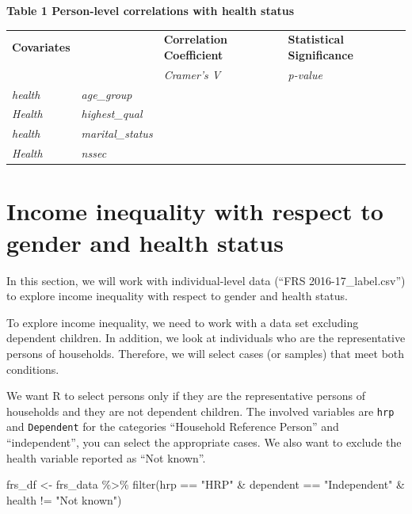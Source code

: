 \documentclass[
  letterpaper,
  DIV=11,
  numbers=noendperiod]{scrreprt}
\newenvironment{Shaded}{\begin{snugshade}}{\end{snugshade}}
\newcommand{\FunctionTok}[1]{\textcolor[rgb]{0.28,0.35,0.67}{#1}}
\newcommand{\NormalTok}[1]{\textcolor[rgb]{0.00,0.23,0.31}{#1}}
\newcommand{\OtherTok}[1]{\textcolor[rgb]{0.00,0.23,0.31}{#1}}
\newcommand{\SpecialCharTok}[1]{\textcolor[rgb]{0.37,0.37,0.37}{#1}}
\newcommand{\StringTok}[1]{\textcolor[rgb]{0.13,0.47,0.30}{#1}}
\begin{document}
\textbf{Table 1 Person-level correlations with health status}

\begin{longtable}[]{@{}
  >{\raggedright\arraybackslash}p{}
  >{\raggedright\arraybackslash}p{}
  >{\raggedright\arraybackslash}p{}
  >{\raggedright\arraybackslash}p{}@{}}
\toprule\noalign{}
\endhead
\bottomrule\noalign{}
\endlastfoot
\textbf{Covariates} & & \textbf{Correlation Coefficient} &
\textbf{Statistical Significance} \\
& & \emph{Cramer's V} & \emph{p-value} \\
\emph{health} & \emph{age\_group} & & \\
\emph{Health} & \emph{highest\_qual} & & \\
\emph{health} & \emph{marital\_status} & & \\
\emph{Health} & \emph{nssec} & & \\
\end{longtable}

\section{Income inequality with respect to gender and health
status}\label{income-inequality-with-respect-to-gender-and-health-status}

In this section, we will work with individual-level data (``FRS
2016-17\_label.csv'') to explore income inequality with respect to
gender and health status.

To explore income inequality, we need to work with a data set excluding
dependent children. In addition, we look at individuals who are the
representative persons of households. Therefore, we will select cases
(or samples) that meet both conditions.

We want R to select persons only if they are the representative persons
of households and they are not dependent children. The involved
variables are \texttt{hrp} and \texttt{Dependent} for the categories
``Household Reference Person'' and ``independent'', you can select the
appropriate cases. We also want to exclude the health variable reported
as ``Not known''.

\begin{Shaded}
\begin{Highlighting}[]
\NormalTok{frs\_df }\OtherTok{\textless{}{-}}\NormalTok{ frs\_data }\SpecialCharTok{\%\textgreater{}\%} \FunctionTok{filter}\NormalTok{(hrp }\SpecialCharTok{==} \StringTok{"HRP"} \SpecialCharTok{\&}
\NormalTok{                                dependent }\SpecialCharTok{==} \StringTok{"Independent"} \SpecialCharTok{\&}
\NormalTok{                                health }\SpecialCharTok{!=} \StringTok{"Not known"}\NormalTok{) }
\end{Highlighting}
\end{Shaded}
\end{document}
